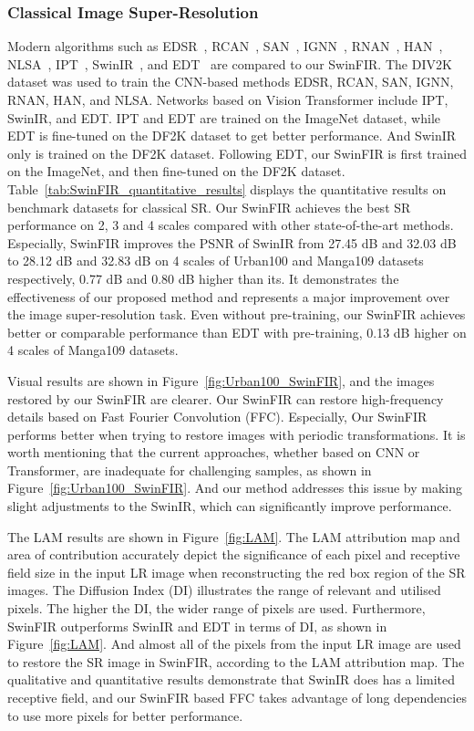 \documentclass[10pt,twocolumn,letterpaper]{article}
\begin{document}
\subsubsection{Classical Image Super-Resolution}
Modern algorithms such as EDSR~\cite{lim2017enhanced}, RCAN~\cite{zhang2018image}, SAN~\cite{dai2019second}, IGNN~\cite{zhou2020cross}, RNAN~\cite{zhang2019residual}, HAN~\cite{niu2020single}, NLSA~\cite{mei2021image}, IPT~\cite{chen2021pre}, SwinIR~\cite{liang2021swinir}, and EDT~\cite{li2021efficient} are compared to our SwinFIR. 
The DIV2K dataset was used to train the CNN-based methods EDSR, RCAN, SAN, IGNN, RNAN, HAN, and NLSA. Networks based on Vision Transformer include IPT, SwinIR, and EDT. IPT and EDT are trained on the ImageNet dataset, while EDT is fine-tuned on the DF2K dataset to get better performance. And SwinIR only is trained on the DF2K dataset. Following EDT, our SwinFIR is first trained on the ImageNet, and then fine-tuned on the DF2K dataset. 
Table~\ref{tab:SwinFIR_quantitative_results} displays the quantitative results on benchmark datasets for classical SR. Our SwinFIR achieves the best SR performance on 2, 3 and 4 scales compared with other state-of-the-art methods. Especially, SwinFIR improves the PSNR of SwinIR from 27.45 dB and 32.03 dB to 28.12 dB and 32.83 dB on 4 scales of Urban100 and Manga109 datasets respectively, 0.77 dB and 0.80 dB higher than its. It demonstrates the effectiveness of our proposed method and represents a major improvement over the image super-resolution task. Even without pre-training, our SwinFIR achieves better or comparable performance than EDT with pre-training, 0.13 dB higher on 4 scales of Manga109 datasets.



Visual results are shown in Figure~\ref{fig:Urban100_SwinFIR}, and the images restored by our SwinFIR are clearer. Our SwinFIR can restore high-frequency details based on Fast Fourier Convolution (FFC). Especially, Our SwinFIR performs better when trying to restore images with periodic transformations. It is worth mentioning that the current approaches, whether based on CNN or Transformer, are inadequate for challenging samples, as shown in Figure~\ref{fig:Urban100_SwinFIR}. And our method addresses this issue by making slight adjustments to the SwinIR, which can significantly improve performance.

The LAM results are shown in Figure~\ref{fig:LAM}. The LAM attribution map and area of contribution accurately depict the significance of each pixel and receptive field size in the input LR image when reconstructing the red box region of the SR images. The Diffusion Index (DI) illustrates the range of relevant and utilised pixels. The higher the DI, the wider range of pixels are used. Furthermore, SwinFIR outperforms SwinIR and EDT in terms of DI, as shown in Figure~\ref{fig:LAM}. And almost all of the pixels from the input LR image are used to restore the SR image in SwinFIR, according to the LAM attribution map. The qualitative and quantitative results demonstrate that SwinIR does has a limited receptive field, and our SwinFIR based FFC takes advantage of long dependencies to use more pixels for better performance. 
\end{document}
